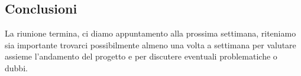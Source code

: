 \documentclass[italian,12pt]{article} %
\begin{document}
\subsection{Conclusioni}
La riunione termina, ci diamo appuntamento alla prossima settimana, riteniamo sia 
importante trovarci possibilmente almeno una volta a settimana per valutare assieme 
l'andamento del progetto e per discutere eventuali problematiche o dubbi.
\end{document}
